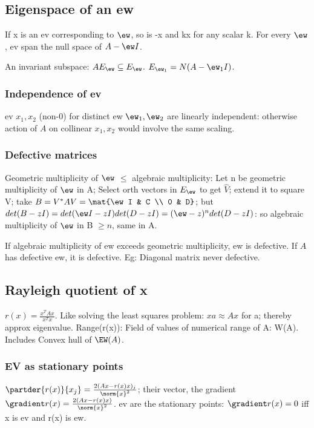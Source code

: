 \documentclass[oneside, article]{memoir}
\begin{document}
\subsection{Eigenspace of an ew}
If x is an ev corresponding to $\ew$, so is -x and kx for any scalar k. For every $\ew$, ev span the null space of $A-\ew I$.

An invariant subspace: $AE_{\ew}\subseteq E_{\ew}$. $E_{\ew_{1}} = N(A-\ew_{1}I)$.

\subsubsection{Independence of ev}
ev $x_{1}, x_{2}$ (non-0) for distinct ew $\ew_{1}, \ew_{2}$ are linearly independent: otherwise action of $A$ on collinear $x_1, x_2$ would involve the same scaling.

\subsubsection{Defective matrices}
Geometric multiplicity of $\ew$ $\leq$ algebraic multiplicity: Let n be geometric multiplicity of $\ew$ in A; Select orth vectors in $E_{\ew}$ to get $\hat{V}$; extend it to square V; take $B=V^{*}AV = \mat{\ew I & C \\ 0 & D}$; but $det(B-zI) = det(\ew I-zI)det(D-zI) = (\ew-z)^{n}det(D-zI)$: so algebraic multiplicity of $\ew$ in B $\geq n$, same in A.

If algebraic multiplicity of ew exceeds geometric multiplicity, ew is defective. If $A$ has defective ew, it is defective. Eg: Diagonal matrix never defective.

\subsection{Rayleigh quotient of x}
$r(x) = \frac{x^{T}Ax}{x^{T}x}$. Like solving the least squares problem: $xa\approx Ax$ for a; thereby approx eigenvalue. Range(r(x)): Field of values of numerical range of A: W(A). Includes Convex hull of $\EW(A)$.

\subsubsection{EV as stationary points}
$\partder{r(x)}{x_{j}} = \frac{2(Ax-r(x)x)_{j}}{\norm{x}^{2}}$; their vector, the gradient $\gradient r(x) = \frac{2(Ax-r(x)x)}{\norm{x}^{2}}$. ev are the stationary points: $\gradient r(x) = 0$ iff x is ev and r(x) is ew.
\end{document}
